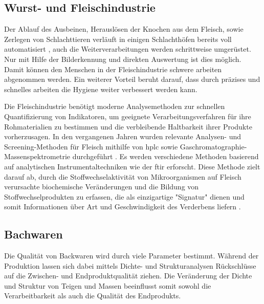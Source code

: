 \subsection{Wurst- und Fleischindustrie}
Der Ablauf des Ausbeinen, Herauslösen der Knochen aus dem Fleisch, sowie Zerlegen von Schlachttieren verläuft in einigen Schlachthöfen bereits voll automatisiert \cite{Buckingham.1995}, auch die Weiterverarbeitungen werden schrittweise umgerüstet. Nur mit Hilfe der Bilderkennung und direkten Auswertung ist dies möglich. Damit können den Menschen  in der Fleischindustrie schwere arbeiten abgenommen werden. Ein weiterer Vorteil beruht darauf, dass durch präzises und schnelles arbeiten die Hygiene weiter verbessert werden kann. 

Die Fleischindustrie benötigt moderne Analysemethoden zur schnellen Quantifizierung von Indikatoren, um geeignete Verarbeitungsverfahren für ihre Rohmaterialien zu bestimmen und die verbleibende Haltbarkeit ihrer Produkte vorherzusagen. In den vergangenen Jahren wurden relevante Analysen- und Screening-Methoden für Fleisch mithilfe von \ac{hplc} sowie Gaschromatographie-Massenspektrometrie durchgeführt \cite{Kodogiannis.2014}. Es werden verschiedene Methoden basierend auf analytischen Instrumentaltechniken wie der \ac{ftir} erforscht. Diese Methode zielt darauf ab, durch die Stoffwechselaktivität von Mikroorganismen auf Fleisch verursachte biochemische Veränderungen und die Bildung von Stoffwechselprodukten zu erfassen, die als einzigartige "Signatur" dienen und somit Informationen über Art und Geschwindigkeit des Verderbens liefern \cite{Nychas.2008}.

\subsection{Bachwaren}
Die Qualität von Backwaren wird durch viele Parameter bestimmt. Während der Produktion lassen sich dabei mittels Dichte- und Strukturanalysen Rückschlüsse auf die Zwischen- und Endproduktqualität ziehen. Die Veränderung der Dichte und Struktur von Teigen und Massen beeinflusst somit sowohl die Verarbeitbarkeit als auch die Qualität des Endprodukts.


